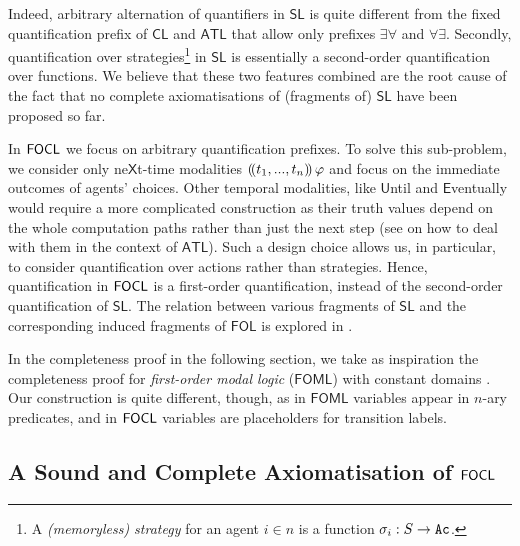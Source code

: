 \documentclass[sigconf,anonymous]{aamas}
\begin{document}
Indeed, arbitrary alternation of quantifiers in $\mathsf{SL}$ is quite different from the fixed quantification prefix of $\mathsf{CL}$ and $\mathsf{ATL}$ that allow only prefixes $\exists \forall$ and $\forall \exists$. Secondly, quantification over strategies\footnote{A \emph{(memoryless) strategy} for an agent $i \in n$ is a function $\sigma_i: S \to \texttt{Ac}$.}  in $\mathsf{SL}$ is essentially a second-order quantification over functions. We believe that these two features combined are the root cause of the fact that no complete axiomatisations of (fragments of) $\mathsf{SL}$ %
have been proposed so far. 

In $\mathsf{FOCL}$ we focus on arbitrary quantification prefixes. To solve this sub-problem, we consider only ne$\mathsf{X}$t-time modalities $(\!( t_1,...,t_n )\!)\, \varphi$ and focus on the immediate outcomes of agents' choices. Other temporal modalities, like $\mathsf{U}$ntil and $\mathsf{E}$ventually would require a more complicated construction as their truth values depend on the whole computation paths rather than just the next step (see \cite{goranko06} on how to deal with them in the context of $\mathsf{ATL}$). Such a design choice allows us, in particular, to consider quantification over actions rather than strategies. %
Hence, quantification in $\mathsf{FOCL}$ is a first-order quantification, instead of the second-order quantification of $\mathsf{SL}$. The relation between various fragments of $\mathsf{SL}$ and the corresponding induced fragments of $\mathsf{FOL}$ is explored in \cite{mogavero15}.

In the completeness proof in the following section, we take as inspiration the completeness proof for \textit{first-order modal logic} ($\mathsf{FOML}$) with constant domains \cite{Garson1984}. Our construction is quite different, though, as in $\mathsf{FOML}$ variables appear in $n$-ary predicates, and in $\mathsf{FOCL}$ variables are placeholders for transition labels.  

\subsection{A Sound and Complete Axiomatisation of $\mathsf{FOCL}$}
\end{document}
